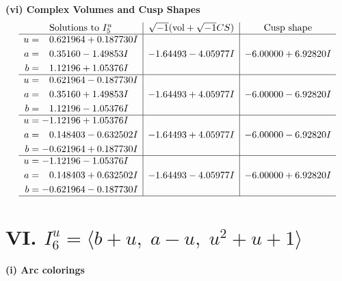 \documentclass[1p]{elsarticle_modified}
\theoremstyle{definition}
\newcommand{\I}{\sqrt{-1}}
\begin{document}
\newpage\flushleft \textbf{(vi) Complex Volumes and Cusp Shapes}
$$\begin{array}{c|c|c}  
\text{Solutions to }I^u_{5}& \I (\text{vol} + \sqrt{-1}CS) & \text{Cusp shape}\\
 \hline 
\begin{aligned}
u &= \phantom{-}0.621964 + 0.187730 I \\
a &= \phantom{-}0.35160 - 1.49853 I \\
b &= \phantom{-}1.12196 + 1.05376 I\end{aligned}
 & -1.64493 - 4.05977 I & -6.00000 + 6.92820 I \\ \hline\begin{aligned}
u &= \phantom{-}0.621964 - 0.187730 I \\
a &= \phantom{-}0.35160 + 1.49853 I \\
b &= \phantom{-}1.12196 - 1.05376 I\end{aligned}
 & -1.64493 + 4.05977 I & -6.00000 - 6.92820 I \\ \hline\begin{aligned}
u &= -1.12196 + 1.05376 I \\
a &= \phantom{-}0.148403 - 0.632502 I \\
b &= -0.621964 + 0.187730 I\end{aligned}
 & -1.64493 + 4.05977 I & -6.00000 - 6.92820 I \\ \hline\begin{aligned}
u &= -1.12196 - 1.05376 I \\
a &= \phantom{-}0.148403 + 0.632502 I \\
b &= -0.621964 - 0.187730 I\end{aligned}
 & -1.64493 - 4.05977 I & -6.00000 + 6.92820 I\\
 \hline 
 \end{array}$$\newpage\newpage\renewcommand{\arraystretch}{1}
\centering \section*{VI. $I^u_{6}= \langle b+u,\;a- u,\;u^2+u+1 \rangle$}
\flushleft \textbf{(i) Arc colorings}\\
\end{document}
